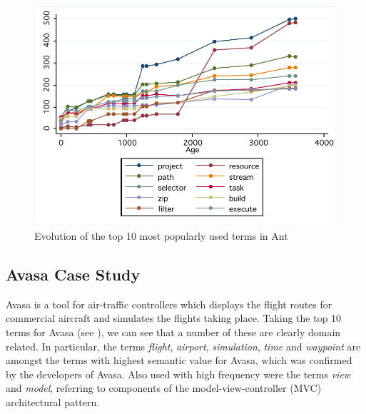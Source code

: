 \begin{figure}[t]
\centering
\includegraphics[width=\textwidth]{Figures/Vocab-AntPopular.pdf}
\caption{Evolution of the top 10 most popularly used terms in Ant}
\label{fig:vocab_popular_terms_ant}
\end{figure}


\subsection{Avasa Case Study} %
\label{sub:avasa_case_study}

Avasa is a tool for air-traffic controllers which displays the flight routes for commercial aircraft and simulates the flights taking place. Taking the top 10 terms for Avasa (see ), we can see that a number of these are clearly domain related. In particular, the terms \emph{flight}, \emph{airport}, \emph{simulation}, \emph{time} and \emph{waypoint} are amongst the terms with highest semantic value for Avasa, which was confirmed by the developers of Avasa. Also used with high frequency were the terms \emph{view} and \emph{model}, referring to components of the model-view-controller (MVC) architectural pattern.

